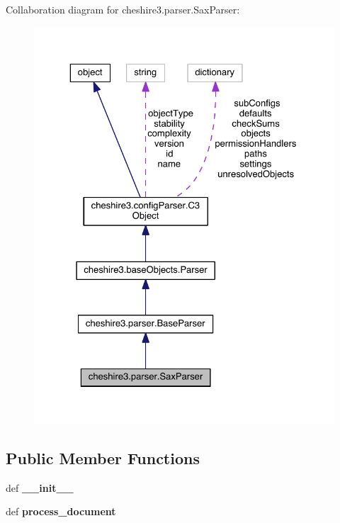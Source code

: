 Collaboration diagram for cheshire3.\-parser.\-Sax\-Parser\-:
\nopagebreak
\begin{figure}[H]
\begin{center}
\leavevmode
\includegraphics[width=325pt]{classcheshire3_1_1parser_1_1_sax_parser__coll__graph}
\end{center}
\end{figure}
\subsection*{Public Member Functions}
\begin{DoxyCompactItemize}
\item 
\hypertarget{classcheshire3_1_1parser_1_1_sax_parser_a42022a4976f994ec19394092516b897f}{def {\bfseries \-\_\-\-\_\-init\-\_\-\-\_\-}}\label{classcheshire3_1_1parser_1_1_sax_parser_a42022a4976f994ec19394092516b897f}

\item 
\hypertarget{classcheshire3_1_1parser_1_1_sax_parser_a9de7acd69d723605fb7a9a5e7f477045}{def {\bfseries process\-\_\-document}}\label{classcheshire3_1_1parser_1_1_sax_parser_a9de7acd69d723605fb7a9a5e7f477045}

\end{DoxyCompactItemize}
